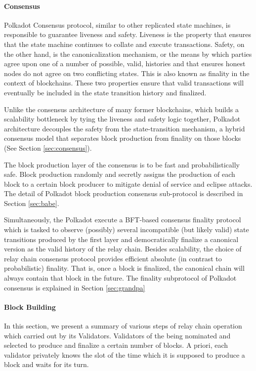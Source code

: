 \paragraph{Consensus}

Polkadot Consensus protocol, similar to other replicated state machines, is responsible to guarantee liveness and safety. Liveness is the property that ensures that the state machine continues to collate and execute transactions. Safety, on the other hand, is the canonicalization mechanism, or the means by which parties agree upon one of a number of possible, valid, histories and that ensures honest nodes do not agree on two conflicting states. This is also known as finality in the context of blockchains. These two properties ensure that valid transactions will eventually be included in the state transition
history and finalized.

Unlike the consensus architecture of many former blockchains, which builds a scalability bottleneck by tying the liveness and safety logic together, Polkadot architecture decouples the safety from the state-transition mechanism, a hybrid consensus model that separates block production from finality on those blocks (See Section \ref{sec:consensus}).

The block production layer of the consensus is to be fast and probabilistically safe. Block production randomly and secretly assigns the production of each block to a certain block producer to mitigate denial of service and eclipse attacks. The detail of Polkadot block production consensus sub-protocol is described in Section \ref{sec:babe}.

Simultaneously, the Polkadot execute a BFT-based consensus finality protocol which is tasked to observe (possibly) several incompatible (but likely valid) state transitions produced by the first layer and democratically finalize a canonical version as the valid history of the relay chain. Besides scalability, the choice of relay chain consensus protocol provides efficient absolute (in contrast to probabilistic) finality. That is, once a block is finalized, the canonical chain will always contain that block in the future. The finality subprotocol of Polkadot consensus is explained in Section
\ref{sec:grandpa}

\paragraph{Block Building}\label{sec:relaychainblockproduction}
In this section, we present a summary of various steps of relay chain operation which carried out by its Validators. Validators of the being nominated and selected to produce and finalize a certain number of blocks. A priori, each validator privately knows the slot of the time which it is supposed to produce a block and waits for its turn.

